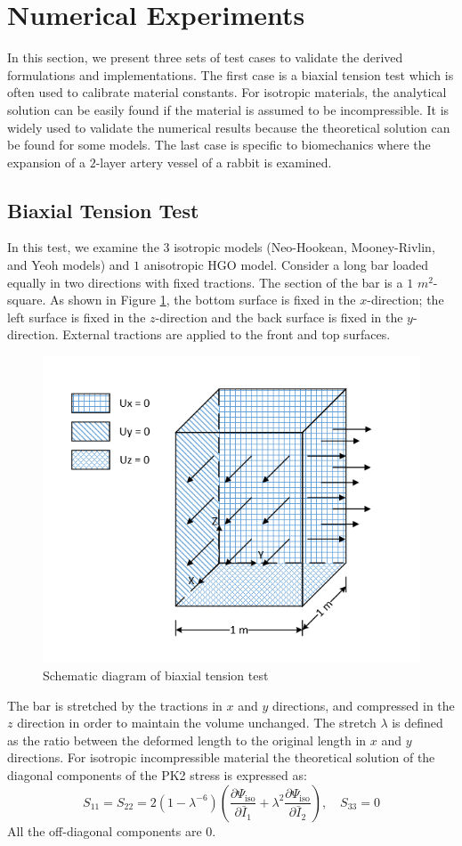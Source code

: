 \section{Numerical Experiments}
\label{experiments}
In this section, we present three sets of test cases to validate the derived formulations and implementations. The first case is a biaxial tension test which is often used to calibrate material constants. For isotropic materials, the analytical solution can be easily found if the material is assumed to be incompressible. It is widely used to validate the numerical results because the theoretical solution can be found for some models. The last case is specific to biomechanics where the expansion of a $2$-layer artery vessel of a rabbit is examined.

\subsection{Biaxial Tension Test}
\label{biaxial_tension_test}
In this test, we examine the $3$ isotropic models (Neo-Hookean, Mooney-Rivlin, and Yeoh models) and $1$ anisotropic HGO model. Consider a long bar loaded equally in two directions with fixed tractions. The section of the bar is a $1$ $m^2$-square. As shown in Figure \ref{fig:biaxial_schematic}, the bottom surface is fixed in the $x$-direction; the left surface is fixed in the $z$-direction and the back surface is fixed in the $y$-direction. External tractions are applied to the front and top surfaces. 

\begin{figure}[H]
\centering
\includegraphics[width=.5\textwidth]{./figures/biaxial_schematic.png}
\caption{Schematic diagram of biaxial tension test}
\label{fig:biaxial_schematic}
\end{figure}

The bar is stretched by the tractions in $x$ and $y$ directions, and compressed in the $z$ direction in order to maintain the volume unchanged. The stretch $\lambda$ is defined as the ratio between the deformed length to the original length in $x$ and $y$ directions. For isotropic incompressible material the theoretical solution of the diagonal components of the PK2 stress is expressed as:
\begin{equation} \label{biaxialPK2}
S_{11} = S_{22} = 2(1 - {\lambda}^{-6})\left(\frac{\partial\Psi_\mathrm{iso}}{\partial\bar{I}_1} + {\lambda}^2\frac{\partial\Psi_\mathrm{iso}}{\partial\bar{I}_2}\right), \quad S_{33} = 0
\end{equation}
All the off-diagonal components are $0$.


